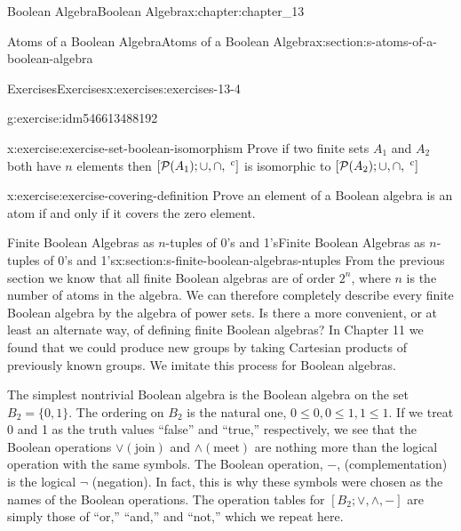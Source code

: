 \documentclass[oneside,10pt,]{book}
\numberwithin{equation}{section}
\begin{document}
\begin{chapterptx}{Boolean Algebra}{}{Boolean Algebra}{}{}{x:chapter:chapter_13}
\begin{sectionptx}{Atoms of a Boolean Algebra}{}{Atoms of a Boolean Algebra}{}{}{x:section:s-atoms-of-a-boolean-algebra}
\begin{exercises-subsection}{Exercises}{}{Exercises}{}{}{x:exercises:exercises-13-4}
\begin{divisionexercise}{8}{}{}{g:exercise:idm546613488192}
\end{divisionexercise}%
\begin{divisionexercise}{9}{}{}{x:exercise:exercise-set-boolean-isomorphism}%
Prove if two finite sets \(A_1\) and \(A_2\) both have \(n\) elements then \([\mathcal{P}(A_1);  \cup , \cap, \hspace{1 mm}^c]\) is isomorphic to \([\mathcal{P}(A_2);  \cup , \cap, \hspace{1 mm}^c]\)%
\end{divisionexercise}%
\begin{divisionexercise}{10}{}{}{x:exercise:exercise-covering-definition}%
Prove an element of a Boolean algebra is an atom if and only if it covers the zero element.%
\end{divisionexercise}%
\end{exercises-subsection}
\end{sectionptx}
%
%
\typeout{************************************************}
\typeout{************************************************}
%
\begin{sectionptx}{Finite Boolean Algebras as \(n\)-tuples of 0's and 1's}{}{Finite Boolean Algebras as \(n\)-tuples of 0's and 1's}{}{}{x:section:s-finite-boolean-algebras-ntuples}
From the previous section we know that all finite Boolean algebras are of order \(2^n\), where \(n\) is the number of atoms in the algebra. We can therefore completely describe every finite Boolean algebra by the algebra of power sets. Is there a more convenient, or at least an alternate way, of defining finite Boolean algebras? In Chapter 11 we found that we could produce new groups by taking Cartesian products of previously known groups. We imitate this process for Boolean algebras.%
\par
The simplest nontrivial Boolean algebra is the Boolean algebra on the set \(B_2=\{0, 1\}\). The ordering on \(B_2\) is the natural one, \(0 \leq
0, 0\leq 1, 1\leq 1\). If we treat 0 and 1 as the truth values ``false'' and ``true,'' respectively, we see that the Boolean operations \(\lor (\textrm{join})\) and \(\land (\textrm{meet})\) are nothing more than the logical operation  with the same symbols.  The Boolean operation, \(-\), (complementation) is the logical \(\neg\) (negation). In fact, this is why these symbols were chosen as the names of the Boolean operations. The operation tables for \(\left[B_2;\lor ,\land, - \right]\) are simply those of ``or,'' ``and,'' and ``not,'' which we repeat here.%
\begin{equation*}

\end{equation*}
\end{sectionptx}
\end{chapterptx}
\end{document}
